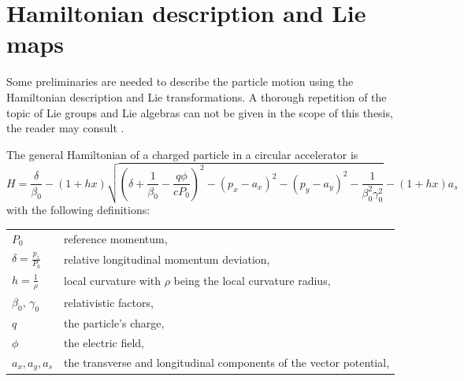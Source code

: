 \section{Hamiltonian description and Lie maps}
\label{sec_hamil_lie}

Some preliminaries are needed to describe the particle motion using the Hamiltonian description
and Lie transformations.
A thorough repetition of the topic of Lie groups and Lie algebras can not be given in the
scope of this thesis, the reader may consult \cite{Georgi1982}.

The general Hamiltonian of a charged particle in a circular accelerator is \cite{WolskiBook, Herr2020}
%
\begin{equation}
    H=\frac{\delta}{\beta_0} - (1+hx)
    \sqrt{
      \left(\delta + \frac{1}{\beta_0} - \frac{q\phi}{cP_0}\right)^2 - (p_x-a_x)^2 - (p_y-a_y)^2
      - \frac{1}{\beta_0^2\gamma_0^2}
    }
    - (1+hx)a_s
\end{equation}
with the following definitions:

\begin{tabular}{ll}
  $P_0$ & reference momentum, \\
  $\delta = \frac{p_z}{P_0}$ & relative longitudinal momentum deviation, \\
  $h=\frac{1}{\rho}$ & local curvature with $\rho$ being the local curvature radius, \\
  $\beta_0$, $\gamma_0$ & relativistic factors, \\
  $q$ & the particle's charge, \\
  $\phi$ & the electric field, \\
  $a_x, a_y, a_s$ & the transverse and longitudinal components of the vector potential,
\end{tabular}

